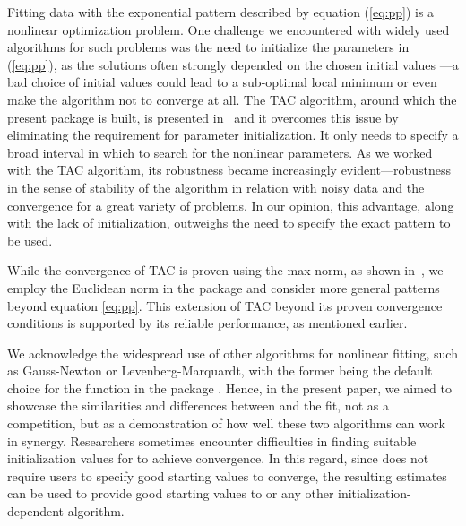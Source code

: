 Fitting data with the exponential pattern described by equation (\ref{eq:pp}) is a nonlinear optimization problem. One challenge we encountered with widely used algorithms for such problems was the need to initialize the parameters in (\ref{eq:pp}), as the solutions often strongly depended on the chosen initial values ---a bad choice of initial values could lead to a sub-optimal local minimum or even make the algorithm not to converge at all. The TAC algorithm, around which the present package is built, is presented in~\citet{tac} and it overcomes this issue by eliminating the requirement for parameter initialization. It only needs to specify a broad interval in which to search for the nonlinear parameters. As we worked with the TAC algorithm, its robustness became increasingly evident---robustness in the sense of stability of the algorithm in relation with noisy data and the convergence for a great variety of problems. In our opinion, this advantage, along with the lack of initialization, outweighs the need to specify the exact pattern to be used.


While the convergence of TAC is proven using the max norm, as shown in~\citet{tac}, we employ the Euclidean norm in the  package and consider more general patterns beyond equation \eqref{eq:pp}. This extension of TAC beyond its proven convergence conditions is supported by its reliable performance, as mentioned earlier.


We acknowledge the widespread use of other algorithms for nonlinear fitting, such as Gauss-Newton or Levenberg-Marquardt, with the former being the default choice for the  function in the  package \citep{R}. Hence, in the present paper, we aimed to showcase the similarities and differences between  and the  fit, not as a competition, but as a demonstration of how well these two algorithms can work in synergy. Researchers sometimes encounter difficulties in finding suitable initialization values for  to achieve convergence. In this regard, since  does not require users to specify good starting values to converge, the resulting estimates can be used to provide good starting values to  or any other initialization-dependent algorithm.









